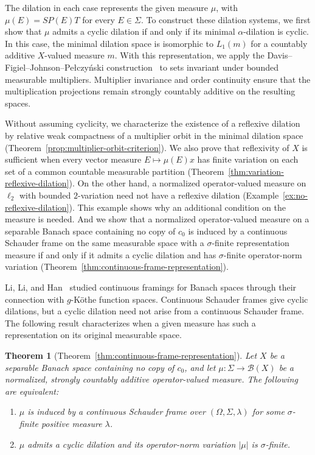 \documentclass[11pt,leqno]{amsart}
\theoremstyle{compact}
\newtheorem{maintheorem}{Theorem}
\numberwithin{equation}{section}
\theoremstyle{compactremark}
\theoremstyle{compact}
\newcommand{\1}{\mathbbm{1}}
\newcommand{\abs}[1]{\left|#1\right|}
\newcommand{\mnote}[2][0pt]{%
    \marginnote{%
        \parbox[t]{1.8cm}{%
            \raggedright\tiny #2%
        }%
    }[#1]%
}
\begin{document}
The dilation in each case represents the given measure $\mu$, with $\mu(E)=SP(E)T$ for every $E\in\Sigma$. To construct these dilation systems, we first show that $\mu$ admits a cyclic dilation if and only if its minimal $\alpha$-dilation is cyclic. In this case, the minimal dilation space is isomorphic to $L_1(m)$ for a countably additive $X$-valued measure $m$. With this representation, we apply the Davis--Figiel--Johnson--Pe\l czy\'nski construction~\cite{DFJP1974} to sets invariant under bounded measurable multipliers. Multiplier invariance and order continuity ensure that the multiplication projections remain strongly countably additive on the resulting spaces.

Without assuming cyclicity, we characterize the existence of a reflexive dilation by relative weak compactness of a multiplier orbit in the minimal dilation space (Theorem~\ref{prop:multiplier-orbit-criterion}). We also prove that reflexivity of $X$ is sufficient when every vector measure $E\mapsto\mu(E)x$ has finite variation on each set of a common countable measurable partition (Theorem~\ref{thm:variation-reflexive-dilation}). On the other hand, a normalized operator-valued measure on $\ell_2$ with bounded $2$-variation need not have a reflexive dilation (Example~\ref{ex:no-reflexive-dilation}). This example shows why an additional condition on the measure is needed. And we show that a normalized operator-valued measure on a separable Banach space containing no copy of $c_0$ is induced by a continuous Schauder frame on the same measurable space with a $\sigma$-finite representation measure if and only if it admits a cyclic dilation and has $\sigma$-finite operator-norm variation (Theorem~\ref{thm:continuous-frame-representation}).

Li, Li, and Han~\cite{LiLiHan2016} studied continuous framings for Banach spaces through their connection with $g$-K\"othe function spaces. Continuous Schauder frames give cyclic dilations, but a cyclic dilation need not arise from a continuous Schauder frame. The following result characterizes when a given measure has such a representation on its original measurable space.

\begin{maintheorem}[Theorem~\ref{thm:continuous-frame-representation}]\label{intro:frame}
Let $X$ be a separable Banach space containing no copy of $c_0$, and let $\mu\colon\Sigma\to\mathcal B(X)$ be a normalized, strongly countably additive operator-valued measure. The following are equivalent:
\begin{enumerate}
\item $\mu$ is induced by a continuous Schauder frame over $(\Omega,\Sigma,\lambda)$ for some $\sigma$-finite positive measure $\lambda$.
\item $\mu$ admits a cyclic dilation and its operator-norm variation $\abs{\mu}$ is $\sigma$-finite.
\end{enumerate}
\end{maintheorem}
\end{document}
